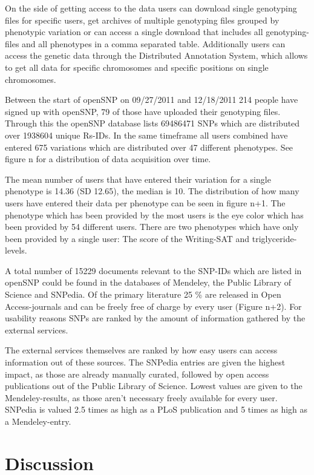 \documentclass[10pt]{article}
\begin{document}
On the side of getting access to the data users can download single genotyping files for specific users, get archives of multiple genotyping files grouped by phenotypic variation or can access a single download that includes all genotyping-files and all phenotypes in a comma separated table. Additionally users can access the genetic data through the Distributed Annotation System, which allows to get all data for specific chromosomes and specific positions on single chromosomes.

Between the start of openSNP on 09/27/2011 and 12/18/2011 214 people have signed up with openSNP, 79 of those have uploaded their genotyping files. Through this the openSNP database lists 69486471 SNPs which are distributed over 1938604 unique Rs-IDs. In the same timeframe all users combined have entered 675 variations which are distributed over 47 different phenotypes. See figure n for a distribution of data acquisition over time. 

The mean number of users that have entered their variation for a single phenotype is 14.36 (SD 12.65), the median is 10. The distribution of how many users have entered their data per phenotype can be seen in figure n+1. The phenotype which has been provided by the most users is the eye color which has been provided by 54 different users. There are two phenotypes which have only been provided by a single user: The score of the Writing-SAT and triglyceride-levels. 

A total number of 15229 documents relevant to the SNP-IDs which are listed in openSNP could be found in the databases of Mendeley, the Public Library of Science and SNPedia. Of the primary literature 25 \% are released in Open Access-journals and can be freely free of charge by every user (Figure n+2). For usability reasons SNPs are ranked by the amount of information gathered by the external services. 

The external services themselves are ranked by how easy users can access information out of these sources. The SNPedia entries are given the highest impact, as those are already manually curated, followed by open access publications out of the Public Library of Science. Lowest values are given to the Mendeley-results, as those aren't necessary freely available for every user. SNPedia is valued 2.5 times as high as a PLoS publication and 5 times as high as a Mendeley-entry.  

\section*{Discussion}
\end{document}
